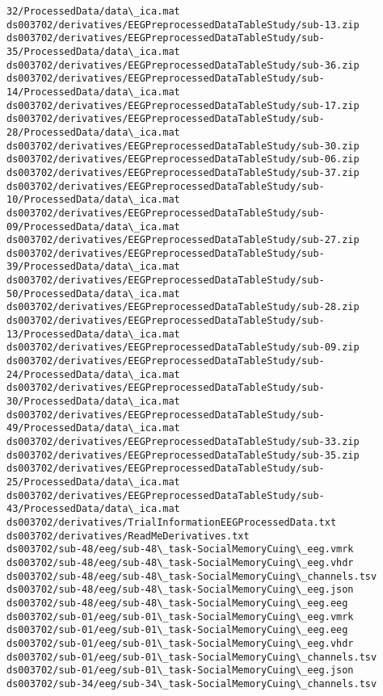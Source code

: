 \documentclass[11pt]{article}
\begin{document}
\begin{Verbatim}[commandchars=\\\{\}]
32/ProcessedData/data\_ica.mat
ds003702/derivatives/EEGPreprocessedDataTableStudy/sub-13.zip
ds003702/derivatives/EEGPreprocessedDataTableStudy/sub-
35/ProcessedData/data\_ica.mat
ds003702/derivatives/EEGPreprocessedDataTableStudy/sub-36.zip
ds003702/derivatives/EEGPreprocessedDataTableStudy/sub-
14/ProcessedData/data\_ica.mat
ds003702/derivatives/EEGPreprocessedDataTableStudy/sub-17.zip
ds003702/derivatives/EEGPreprocessedDataTableStudy/sub-
28/ProcessedData/data\_ica.mat
ds003702/derivatives/EEGPreprocessedDataTableStudy/sub-30.zip
ds003702/derivatives/EEGPreprocessedDataTableStudy/sub-06.zip
ds003702/derivatives/EEGPreprocessedDataTableStudy/sub-37.zip
ds003702/derivatives/EEGPreprocessedDataTableStudy/sub-
10/ProcessedData/data\_ica.mat
ds003702/derivatives/EEGPreprocessedDataTableStudy/sub-
09/ProcessedData/data\_ica.mat
ds003702/derivatives/EEGPreprocessedDataTableStudy/sub-27.zip
ds003702/derivatives/EEGPreprocessedDataTableStudy/sub-
39/ProcessedData/data\_ica.mat
ds003702/derivatives/EEGPreprocessedDataTableStudy/sub-
50/ProcessedData/data\_ica.mat
ds003702/derivatives/EEGPreprocessedDataTableStudy/sub-28.zip
ds003702/derivatives/EEGPreprocessedDataTableStudy/sub-
13/ProcessedData/data\_ica.mat
ds003702/derivatives/EEGPreprocessedDataTableStudy/sub-09.zip
ds003702/derivatives/EEGPreprocessedDataTableStudy/sub-
24/ProcessedData/data\_ica.mat
ds003702/derivatives/EEGPreprocessedDataTableStudy/sub-
30/ProcessedData/data\_ica.mat
ds003702/derivatives/EEGPreprocessedDataTableStudy/sub-
49/ProcessedData/data\_ica.mat
ds003702/derivatives/EEGPreprocessedDataTableStudy/sub-33.zip
ds003702/derivatives/EEGPreprocessedDataTableStudy/sub-35.zip
ds003702/derivatives/EEGPreprocessedDataTableStudy/sub-
25/ProcessedData/data\_ica.mat
ds003702/derivatives/EEGPreprocessedDataTableStudy/sub-
43/ProcessedData/data\_ica.mat
ds003702/derivatives/TrialInformationEEGProcessedData.txt
ds003702/derivatives/ReadMeDerivatives.txt
ds003702/sub-48/eeg/sub-48\_task-SocialMemoryCuing\_eeg.vmrk
ds003702/sub-48/eeg/sub-48\_task-SocialMemoryCuing\_eeg.vhdr
ds003702/sub-48/eeg/sub-48\_task-SocialMemoryCuing\_channels.tsv
ds003702/sub-48/eeg/sub-48\_task-SocialMemoryCuing\_eeg.json
ds003702/sub-48/eeg/sub-48\_task-SocialMemoryCuing\_eeg.eeg
ds003702/sub-01/eeg/sub-01\_task-SocialMemoryCuing\_eeg.vmrk
ds003702/sub-01/eeg/sub-01\_task-SocialMemoryCuing\_eeg.eeg
ds003702/sub-01/eeg/sub-01\_task-SocialMemoryCuing\_eeg.vhdr
ds003702/sub-01/eeg/sub-01\_task-SocialMemoryCuing\_channels.tsv
ds003702/sub-01/eeg/sub-01\_task-SocialMemoryCuing\_eeg.json
ds003702/sub-34/eeg/sub-34\_task-SocialMemoryCuing\_channels.tsv

\end{Verbatim}
\end{document}
